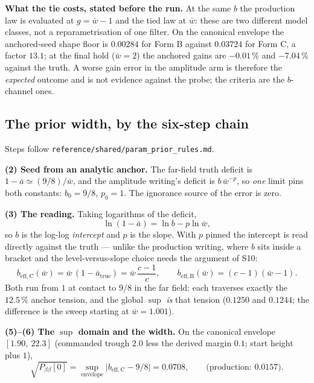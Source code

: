 \documentclass[11pt,a4paper,fontset=none]{ctexart}
\begin{document}
\textbf{What the tie costs, stated before the run.} At the same $b$ the
production law is evaluated at $g = \bar{w}-1$ and the tied law at
$\bar{w}$: these are two different model classes, not a reparametrisation of
one filter. On the canonical envelope the anchored-seed shape floor is
$0.00284$ for Form B against $0.03724$ for Form C, a factor $13.1$; at the
final hold ($\bar{w}=2$) the anchored gains are $-0.01\,\%$ and $-7.04\,\%$
against the truth. A worse gain error in the amplitude arm is therefore the
\emph{expected} outcome and is not evidence against the probe; the criteria
are the $b$-channel ones.

\subsection*{The prior width, by the six-step chain}

Steps follow \texttt{reference/shared/param\_prior\_rules.md}.

\textbf{(2) Seed from an analytic anchor.} The far-field truth deficit is
$1-\bar{a} \simeq (9/8)/\bar{w}$, and the amplitude writing's deficit is
$b\,\bar{w}^{-p}$, so \emph{one} limit pins both constants: $b_0 = 9/8$,
$p_0 = 1$. The ignorance source of the error is zero.

\textbf{(3) The reading.} Taking logarithms of the deficit,
\begin{equation*}
\ln(1-\bar{a}) = \ln b - p \ln \bar{w} ,
\end{equation*}
so $b$ is the log-log \emph{intercept} and $p$ is the slope. With $p$ pinned
the intercept is read directly against the truth --- unlike the production
writing, where $b$ sits inside a bracket and the level-versus-slope choice
needs the argument of S10:
\begin{equation*}
b_{\mathrm{eff},\text{C}}(\bar{w}) = \bar{w}\,(1-\bar{a}_{\mathrm{true}})
  = \bar{w}\,\frac{c-1}{c} ,
\qquad
b_{\mathrm{eff},\text{B}}(\bar{w}) = (c-1)(\bar{w}-1) .
\end{equation*}
Both run from $1$ at contact to $9/8$ in the far field: each traverses exactly
the $12.5\,\%$ anchor tension, and the global $\sup$ \emph{is} that tension
($0.1250$ and $0.1244$; the difference is the sweep starting at
$\bar{w}=1.001$).

\textbf{(5)--(6) The $\sup$ domain and the width.} On the canonical envelope
$[1.90,\ 22.3]$ (commanded trough $2.0$ less the derived margin $0.1$;
start height plus $1$),
\begin{equation*}
\sqrt{P_{\beta\beta}[0]} = \sup_{\text{envelope}}
  \bigl|b_{\mathrm{eff},\text{C}} - 9/8\bigr| = 0.0708 ,
\qquad
\text{(production: } 0.0157\text{)} .
\end{equation*}
\end{document}
